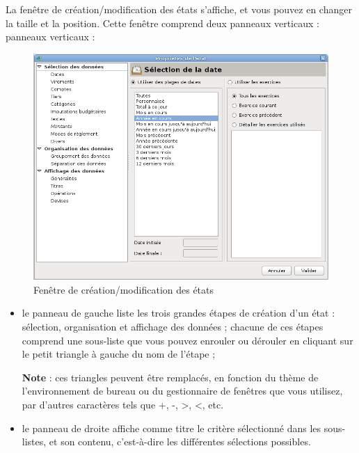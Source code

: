 La fenêtre de création/modification des états s'affiche, et vous pouvez en changer la taille et la position. Cette fenêtre comprend deux \ifIllustration panneaux verticaux :
\else panneaux verticaux :
\fi

\ifIllustration
\begin{figure}[htbp]
\begin{center}
\includegraphics[scale=0.50]{image/screenshot/reportcreation_datas}
\end{center}
\caption{Fenêtre de création/modification des états}
\label{reportcreation-datas-img}
\end{figure}
\fi

\begin{itemize}
	 \item le panneau de gauche liste les trois grandes étapes de création d'un état : sélection, organisation et affichage des données ; chacune de ces étapes comprend une sous-liste que vous pouvez enrouler ou dérouler en cliquant sur le petit triangle à gauche du nom de l'étape ;

	\textbf{Note} : ces triangles peuvent être remplacés, en fonction du thème de l'environnement de bureau ou du gestionnaire de fenêtres que vous utilisez, par d'autres caractères tels que +, -, >, <, etc.
	 \item le panneau de droite affiche comme titre le critère sélectionné dans les sous-listes, et son contenu, c'est-à-dire les différentes sélections possibles.
\end{itemize}

